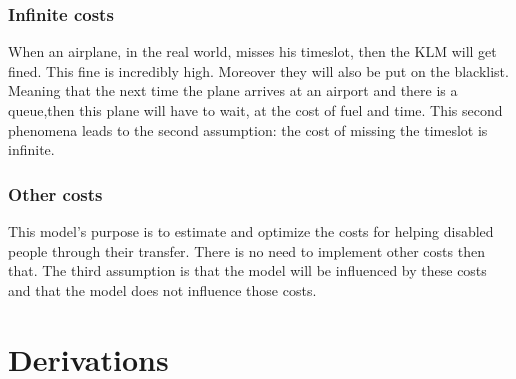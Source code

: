 \documentclass[a4paper, 11pt, notitlepage]{report}
\begin{document}
		\subsection{Infinite costs} When an airplane, in the real world, misses his timeslot, then the KLM will get fined. This fine is incredibly high. Moreover they will also be put on the blacklist. Meaning that the next time the plane arrives at an airport and there is a queue,then this plane will have to wait, at the cost of fuel and time. This second phenomena leads to the second assumption: the cost of missing the timeslot is infinite.
		
		\subsection{Other costs} This model's purpose is to estimate and optimize the costs for helping disabled people through their transfer. There is no need to implement other costs then that. The third assumption is that the model will be influenced by these costs and that the model does not influence those costs.
		
\chapter{Derivations}
\end{document}

